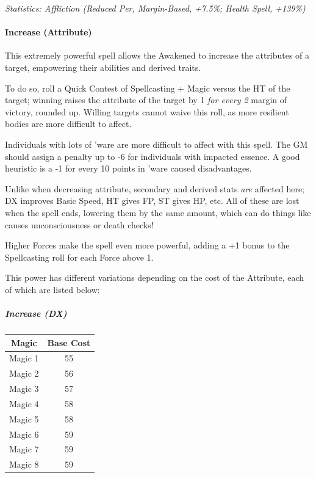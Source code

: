 \begin{multicols}{3}
	\textcolor{OliveGreen}{\textit{Statistics: Affliction (Reduced Per, Margin-Based, +7.5\%; Health Spell, +139\%) }}
		
	\paragraph{Increase (Attribute)}
	
	This extremely powerful spell allows the Awakened to increase the attributes of a target, empowering their abilities and derived traits.
	
	To do so, roll a Quick Contest of Spellcasting + Magic versus the HT of the target; winning raises the attribute of the target by 1 \textit{for every 2} margin of victory, rounded up. Willing targets cannot waive this roll, as more resilient bodies are more difficult to affect.
	
	Individuals with lots of 'ware are more difficult to affect with this spell. The GM should assign a penalty up to -6 for individuals with impacted essence. A good heuristic is a -1 for every 10 points in 'ware caused disadvantages.
	
	Unlike when decreasing attribute, secondary and derived stats \textit{are} affected here; DX improves Basic Speed, HT gives FP, ST gives HP, etc. All of these are lost when the spell ends, lowering them by the same amount, which can do things like causes unconsciousness or death checks!
	
	Higher Forces make the spell even more powerful, adding a +1 bonus to the Spellcasting roll for each Force above 1.
	
	This power has different variations depending on the cost of the Attribute, each of which are listed below:
		
	\subparagraph{Increase (DX)}
	
	\begin{center}
		\begin{tabular}{|c|c|}
			\hline
			Magic & Base Cost \\
			\hline
			\hline
			Magic 1 & 55 \\
			Magic 2 & 56 \\
			Magic 3 & 57 \\
			Magic 4 & 58 \\
			Magic 5 & 58 \\
			Magic 6 & 59 \\
			Magic 7 & 59 \\
			Magic 8 & 59 \\
			\hline
		\end{tabular}
	\end{center}	
	

\end{multicols}
